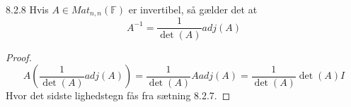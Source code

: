 \begin{korollar}{8.2.8}
	Hvis $A \in Mat_{n,n}(\mathbb{F})$ er invertibel, så gælder det at
	\[
		A^{-1} = \frac{1}{\det(A)}adj(A)
	\]
\end{korollar}
\begin{proof}
	\[
		A(\frac{1}{\det(A)}adj(A)) = \frac{1}{\det(A)}Aadj(A) = 
		\frac{1}{\det(A)}\det(A)I
	\]
	Hvor det sidste lighedstegn fås fra sætning 8.2.7.
\end{proof}
